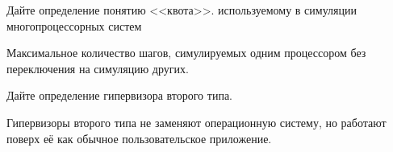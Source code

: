 \documentclass[a4paper, addpoints]{exam}
\begin{document}
\begin{questions}
\question[3] Дайте определение понятию <<квота>>. используемому в симуляции многопроцессорных систем
\begin{solution}[1cm]
Максимальное количество шагов, симулируемых одним процессором без переключения на симуляцию других.
\end{solution}

\question[3] Дайте определение гипервизора второго типа.
\begin{solution}[2cm]
Гипервизоры второго типа  не заменяют операционную систему, но работают поверх её как обычное пользовательское приложение.
\end{solution}


    


    


\end{questions}
\end{document}
